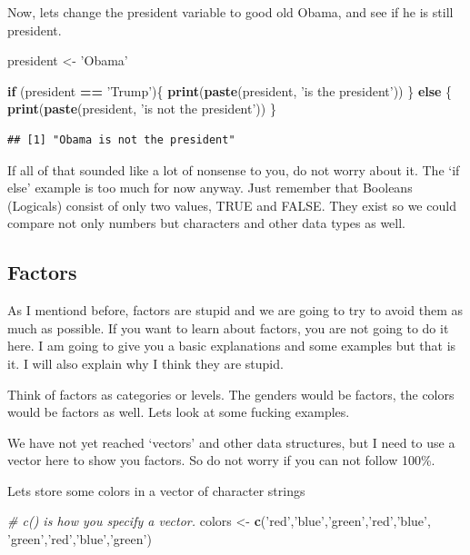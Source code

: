 \documentclass[]{book}
\newenvironment{Shaded}{\begin{snugshade}}{\end{snugshade}}
\newcommand{\CommentTok}[1]{\textcolor[rgb]{0.56,0.35,0.01}{\textit{#1}}}
\newcommand{\ControlFlowTok}[1]{\textcolor[rgb]{0.13,0.29,0.53}{\textbf{#1}}}
\newcommand{\KeywordTok}[1]{\textcolor[rgb]{0.13,0.29,0.53}{\textbf{#1}}}
\newcommand{\NormalTok}[1]{#1}
\newcommand{\OperatorTok}[1]{\textcolor[rgb]{0.81,0.36,0.00}{\textbf{#1}}}
\newcommand{\StringTok}[1]{\textcolor[rgb]{0.31,0.60,0.02}{#1}}
\begin{document}
Now, lets change the president variable to good old Obama, and see if he is still president.

\begin{Shaded}
\begin{Highlighting}[]
\NormalTok{president <-}\StringTok{ 'Obama'}

\ControlFlowTok{if}\NormalTok{ (president }\OperatorTok{==}\StringTok{ 'Trump'}\NormalTok{)\{}
  \KeywordTok{print}\NormalTok{(}\KeywordTok{paste}\NormalTok{(president, }\StringTok{'is the president'}\NormalTok{))}
\NormalTok{\} }\ControlFlowTok{else}\NormalTok{ \{}
  \KeywordTok{print}\NormalTok{(}\KeywordTok{paste}\NormalTok{(president, }\StringTok{'is not the president'}\NormalTok{))}
\NormalTok{\}}
\end{Highlighting}
\end{Shaded}

\begin{verbatim}
## [1] "Obama is not the president"
\end{verbatim}

If all of that sounded like a lot of nonsense to you, do not worry about it. The `if else' example is too much for now anyway. Just remember that Booleans (Logicals) consist of only two values, TRUE and FALSE. They exist so we could compare not only numbers but characters and other data types as well.

\hypertarget{factors}{%
\subsection{Factors}\label{factors}}

As I mentiond before, factors are stupid and we are going to try to avoid them as much as possible. If you want to learn about factors, you are not going to do it here. I am going to give you a basic explanations and some examples but that is it. I will also explain why I think they are stupid.

Think of factors as categories or levels. The genders would be factors, the colors would be factors as well. Lets look at some fucking examples.

We have not yet reached `vectors' and other data structures, but I need to use a vector here to show you factors. So do not worry if you can not follow 100\%.

Lets store some colors in a vector of character strings

\begin{Shaded}
\begin{Highlighting}[]
\CommentTok{# c() is how you specify a vector.}
\NormalTok{colors <-}\StringTok{ }\KeywordTok{c}\NormalTok{(}\StringTok{'red'}\NormalTok{,}\StringTok{'blue'}\NormalTok{,}\StringTok{'green'}\NormalTok{,}\StringTok{'red'}\NormalTok{,}\StringTok{'blue'}\NormalTok{,}
              \StringTok{'green'}\NormalTok{,}\StringTok{'red'}\NormalTok{,}\StringTok{'blue'}\NormalTok{,}\StringTok{'green'}\NormalTok{)}
\end{Highlighting}
\end{Shaded}
\end{document}
